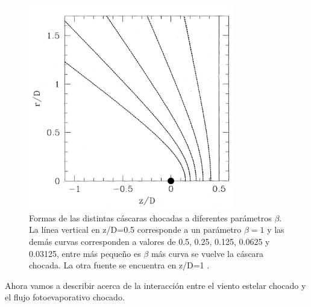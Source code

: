 \documentclass{book}
\begin{document}
\begin{figure}[htb]
    \centering    \includegraphics[width=0.8\textwidth]{images Chapter 2/C2_Canto2.jpg}
    \caption{Formas de las distintas cáscaras chocadas a diferentes parámetros $\beta$. La línea vertical en z/D=0.5 corresponde a un parámetro $\beta=1$ y las demás curvas corresponden a valores de 0.5, 0.25, 0.125, 0.0625 y 0.03125, entre más pequeño es $\beta$ más curva se vuelve la cáscara chocada. La otra fuente se encuentra en z/D=1 \citep{Canto:1996}.}
    \label{fig:Canto2}
\end{figure}

Ahora vamos a describir acerca de la interacción entre el viento estelar chocado y el flujo fotoevaporativo chocado. 

\end{document}
